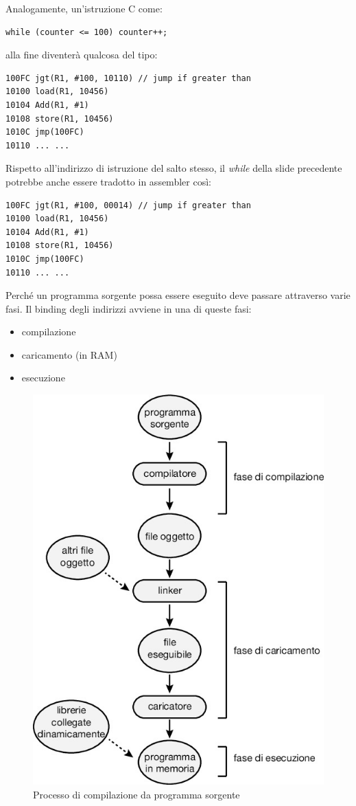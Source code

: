 Analogamente, un'istruzione C come:
\begin{verbatim}
while (counter <= 100) counter++;
\end{verbatim}
alla fine diventerà qualcosa del tipo:
\begin{verbatim}
100FC jgt(R1, #100, 10110) // jump if greater than
10100 load(R1, 10456)
10104 Add(R1, #1)
10108 store(R1, 10456)
1010C jmp(100FC)
10110 ... ...
\end{verbatim}

Rispetto all'indirizzo di istruzione del salto stesso, il \textit{while} della slide precedente potrebbe anche essere tradotto in assembler così:
\begin{verbatim}
100FC jgt(R1, #100, 00014) // jump if greater than
10100 load(R1, 10456)
10104 Add(R1, #1)
10108 store(R1, 10456)
1010C jmp(100FC)
10110 ... ...
\end{verbatim}

Perché un programma sorgente
possa essere eseguito deve passare
attraverso varie fasi. Il binding degli indirizzi avviene
in una di queste fasi:
\begin{itemize}
    \item compilazione
    \item caricamento (in RAM)
    \item esecuzione
\end{itemize}

\begin{figure}[h]
    \centering
    \includegraphics[width=0.25\linewidth]{images/process_compilation.png}
    \caption{Processo di compilazione da programma sorgente}
    \label{fig:compilate-process}
\end{figure}

